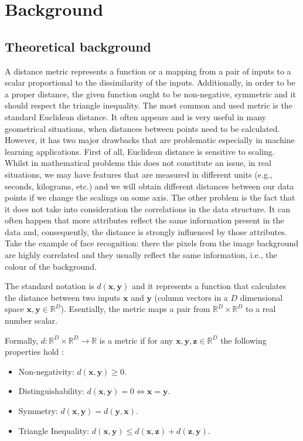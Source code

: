 \chapter{Background}

\section{Theoretical background}
\label{sec:theoretical-background}

A distance metric represents a function or a mapping from a pair of inputs to a scalar proportional to the dissimilarity of the inputs. Additionally, in order to be a proper distance, the given function ought to be non-negative, symmetric and it should respect the triangle inequality. The most common and used metric is the standard Euclidean distance. It often appears and is very useful in many geometrical situations, when distances between points need to be calculated. However, it has two major drawbacks that are problematic especially in machine learning applications. First of all, Euclidean distance is sensitive to scaling. Whilst in mathematical problems this does not constitute an issue, in real situations, we may have features that are measured in different units (e.g., seconds, kilograms, etc.) and we will obtain different distances between our data points if we change the scalings on some axis. The other problem is the fact that it does not take into consideration the correlations in the data structure. It can often happen that more attributes reflect the same information present in the data and, consequently, the distance is strongly influenced by those attributes. Take the example of face recognition: there the pixels from the image background are highly correlated and they usually reflect the same information, i.e., the colour of the background.

The standard notation is $d(\mathbf{x},\mathbf{y})$ and it represents a function that calculates the distance between two inputs $\mathbf{x}$ and $\mathbf{y}$ (column vectors in a $D$ dimensional space $\mathbf{x},\mathbf{y}\in \mathbb{R}^D$). Esentially, the metric maps a pair from $\mathbb{R}^D\times \mathbb{R}^D$ to a real number scalar. 

Formally, $d:\mathbb{R}^D\times \mathbb{R}^D \to \mathbb{R}$ is a metric if for any $\mathbf{x,y,z}\in \mathbb{R}^D$ the following properties hold \cite{Kochanski2009}:
\begin{itemize}
 \item Non-negativity: $d(\mathbf{x},\mathbf{y}) \ge 0$.
 \item Distinguishability: $d(\mathbf{x},\mathbf{y})=0 \Leftrightarrow  \mathbf{x}=\mathbf{y}$.
 \item Symmetry: $d(\mathbf{x},\mathbf{y})=d(\mathbf{y},\mathbf{x})$.
 \item Triangle Inequality: $d(\mathbf{x},\mathbf{y})\leq d(\mathbf{x},\mathbf{z}) + d(\mathbf{z},\mathbf{y})$.
\end{itemize}

